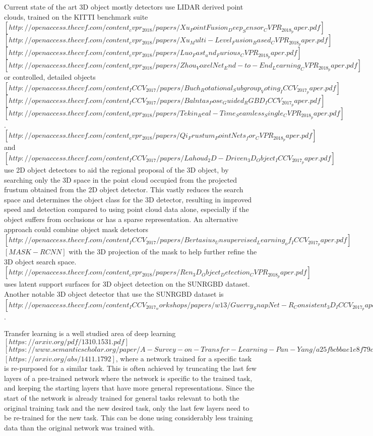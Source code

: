 \documentclass[11pt]{article}
\begin{document}
Current state of the art 3D object mostly detectors use LIDAR derived point clouds, trained on the KITTI benchmark suite $[http://openaccess.thecvf.com/content_cvpr_2018/papers/Xu_PointFusion_Deep_Sensor_CVPR_2018_paper.pdf]$$[http://openaccess.thecvf.com/content_cvpr_2018/papers/Xu_Multi-Level_Fusion_Based_CVPR_2018_paper.pdf]$$[http://openaccess.thecvf.com/content_cvpr_2018/papers/Luo_Fast_and_Furious_CVPR_2018_paper.pdf]$$[http://openaccess.thecvf.com/content_cvpr_2018/papers/Zhou_VoxelNet_End-to-End_Learning_CVPR_2018_paper.pdf]$ or controlled, detailed objects $[http://openaccess.thecvf.com/content_ICCV_2017/papers/Buch_Rotational_Subgroup_Voting_ICCV_2017_paper.pdf]$$[http://openaccess.thecvf.com/content_ICCV_2017/papers/Balntas_Pose_Guided_RGBD_ICCV_2017_paper.pdf]$$[http://openaccess.thecvf.com/content_cvpr_2018/papers/Tekin_Real-Time_Seamless_Single_CVPR_2018_paper.pdf]$. $[http://openaccess.thecvf.com/content_cvpr_2018/papers/Qi_Frustum_PointNets_for_CVPR_2018_paper.pdf]$ and $[http://openaccess.thecvf.com/content_ICCV_2017/papers/Lahoud_2D-Driven_3D_Object_ICCV_2017_paper.pdf]$ use 2D object detectors to aid the regional proposal of the 3D object, by searching only the 3D space in the point cloud occupied from the projected frustum obtained from the 2D object detector. This vastly reduces the search space and determines the object class for the 3D detector, resulting in improved speed and detection compared to using point cloud data alone, especially if the object suffers from occlusions or has a sparse representation. An alternative approach could combine object mask detectors$[http://openaccess.thecvf.com/content_ICCV_2017/papers/Bertasius_Unsupervised_Learning_of_ICCV_2017_paper.pdf]$$[MASK-RCNN]$ with the 3D projection of the mask to help further refine the 3D object search space. $[http://openaccess.thecvf.com/content_cvpr_2018/papers/Ren_3D_Object_Detection_CVPR_2018_paper.pdf]$ uses latent support surfaces for 3D object detection on the SUNRGBD dataset. Another notable 3D object detector that use the SUNRGBD dataset is $[http://openaccess.thecvf.com/content_ICCV_2017_workshops/papers/w13/Guerry_SnapNet-R_Consistent_3D_ICCV_2017_paper.pdf]$. 

Transfer learning is a well studied area of deep learning $[https://arxiv.org/pdf/1310.1531.pdf]$$[https://www.semanticscholar.org/paper/A-Survey-on-Transfer-Learning-Pan-Yang/a25fbcbbae1e8f79c4360d26aa11a3abf1a11972]$$[https://arxiv.org/abs/1411.1792]$, where a network trained for a specific task is re-purposed for a similar task. This is often achieved by truncating the last few layers of a pre-trained network where the network is specific to the trained task, and keeping the starting layers that have more general representations. Since the start of the network is already trained for general tasks relevant to both the original training task and the new desired task, only the last few layers need to be re-trained for the new task. This can be done using considerably less training data than the original network was trained with.
\end{document}
